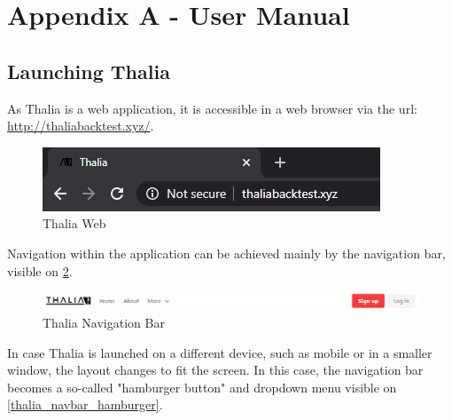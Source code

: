 \documentclass[main.tex]{subfiles}
\begin{document}
\section{Appendix A - User Manual}
\label{user_manual}
\subsection{Launching Thalia}
As Thalia is a web application, it is accessible in a web browser via the url: \url{http://thaliabacktest.xyz/}.



\begin{figure}[H]

   \centering

   \includegraphics[scale=0.8]{08Appendices/081User/081Pictures/thalia_domain.png}

   \caption{Thalia Web}

   \label{thalia_web}

\end{figure}



Navigation within the application can be achieved mainly by the navigation bar, visible on \figurename{\ref{thalia_navbar}}.



\begin{figure}[H]

   \centering

   \includegraphics[width=\textwidth]{08Appendices/081User/081Pictures/navbar.png}

   \caption{Thalia Navigation Bar}

   \label{thalia_navbar}

\end{figure}



In case Thalia is launched on a different device, such as mobile or in a smaller window, the layout changes to fit the screen. In this case, the navigation bar becomes a so-called "hamburger button" and dropdown menu visible on \figurename{\ref{thalia_navbar_hamburger}}.
\end{document}

